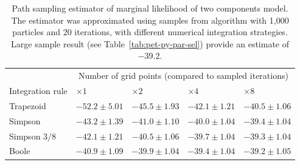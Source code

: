 \begin{table}
  \begingroup\small
  \begin{tabularx}{\linewidth}{lXXXX}
    \toprule
    & \multicolumn{4}{c}{Number of grid points (compared to sampled iterations)} \\
    \cmidrule(lr){2-5}
    Integration rule & $\times1$ & $\times2$ & $\times4$ & $\times8$ \\
    \midrule
    Trapezoid
    & $-52.2\pm5.01$ & $-45.5\pm1.93$ & $-42.1\pm1.21$ & $-40.5\pm1.06$ \\
    Simpson
    & $-43.2\pm1.39$ & $-41.0\pm1.10$ & $-40.0\pm1.04$ & $-39.4\pm1.04$ \\
    Simpson $3/8$
    & $-42.1\pm1.21$ & $-40.5\pm1.06$ & $-39.7\pm1.04$ & $-39.3\pm1.04$ \\
    Boole
    & $-40.9\pm1.09$ & $-39.9\pm1.04$ & $-39.4\pm1.04$ & $-39.2\pm1.05$ \\
    \bottomrule
  \end{tabularx}\endgroup
  \caption{Path sampling estimator of marginal likelihood of two components
    \pet model. The estimator was approximated using samples from \smc[2]
    algorithm with 1,000 particles and 20 iterations, with different numerical
    integration strategies. Large sample result (see
    Table~\ref{tab:pet-py-par-sel}) provide an estimate of $-39.2$.}
  \label{tab:pet-py-bias-reduction}
\end{table}
